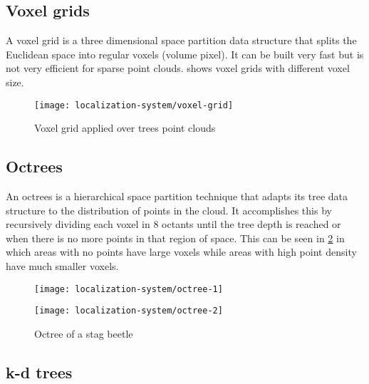 \subsection{Voxel grids}

A voxel grid is a three dimensional space partition data structure that splits the Euclidean space into regular voxels (volume pixel). It can be built very fast but is not very efficient for sparse point clouds.  shows voxel grids with different voxel size.

\begin{figure}[H]
	\centering
	\texttt{[image: localization-system/voxel-grid]}
	\caption[Voxel grid applied over trees point clouds]{Voxel grid applied over trees point clouds \cite{Wu2013}}
	\label{fig:localization_system_voxel-grid}
\end{figure}



\subsection{Octrees}

An octrees is a hierarchical space partition technique that adapts its tree data structure to the distribution of points in the cloud. It accomplishes this by recursively dividing each voxel in 8 octants until the tree depth is reached or when there is no more points in that region of space. This can be seen in \cref{fig:localization_system_octree} in which areas with no points have large voxels while areas with high point density have much smaller voxels.

\begin{figure}[H]
	\centering
	\begin{minipage}[h]{.495\textwidth}
		\centering
		\texttt{[image: localization-system/octree-1]}
	\end{minipage}\hfill
	\begin{minipage}[h]{.495\textwidth}
		\centering
		\texttt{[image: localization-system/octree-2]}
	\end{minipage}
	\caption[Octree of a stag beetle]{Octree of a stag beetle\protect\footnotemark}
	\label{fig:localization_system_octree}
\end{figure}



\subsection{k-d trees}

